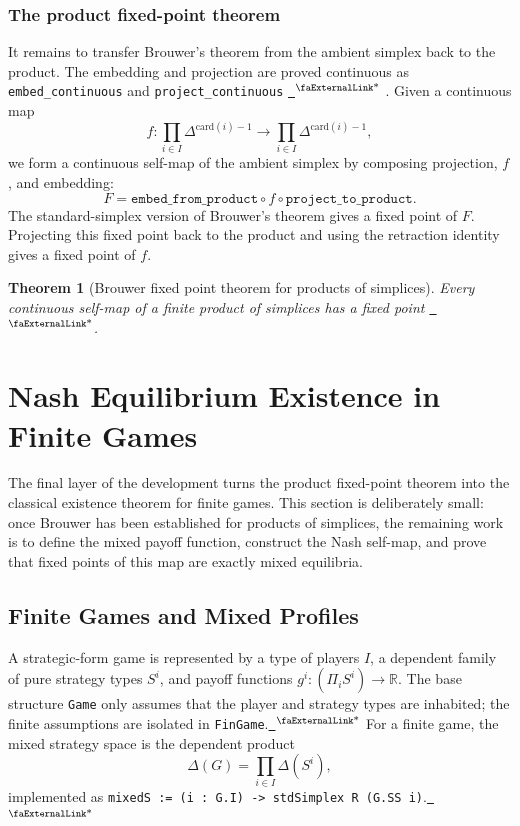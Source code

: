 \documentclass{article}
\newtheorem{theorem}{Theorem}[section]
\theoremstyle{definition}
\newcommand{\extlink}{~\ensuremath{{}^\text{\faExternalLink*}}}
\begin{document}
\subsubsection{The product fixed-point theorem}

It remains to transfer Brouwer's theorem from the ambient simplex back to the product. The embedding and projection are proved continuous as \texttt{embed\_continuous} and \texttt{project\_continuous}
\href{https://github.com/Solo-ary/Game-Theory-Formalization/blob/7b49d5267d4f26b17bdf071250880b63e96999b6/Brouwer/Gametheory/Brouwer_product.lean#L560-L652}{\extlink}
.
Given a continuous map
$$
f:\prod_{i\in I}\Delta^{\mathrm{card}(i)-1}
\to
\prod_{i\in I}\Delta^{\mathrm{card}(i)-1},
$$
we form a continuous self-map of the ambient simplex by composing projection, $f$, and embedding:
$$
F =
\texttt{embed\_from\_product}\circ f\circ \texttt{project\_to\_product}.
$$
The standard-simplex version of Brouwer's theorem gives a fixed point of $F$. Projecting this fixed point back to the product and using the retraction identity gives a fixed point of $f$.

\begin{theorem}[Brouwer fixed point theorem for products of simplices]
Every continuous self-map of a finite product of simplices has a fixed point
\href{https://github.com/Solo-ary/Game-Theory-Formalization/blob/7b49d5267d4f26b17bdf071250880b63e96999b6/Brouwer/Gametheory/Brouwer_product.lean#L654-L669}{\extlink}.
\end{theorem}


\section{Nash Equilibrium Existence in Finite Games}\label{sec:Nash}
The final layer of the development turns the product fixed-point theorem into the classical existence theorem for finite games.  This section is deliberately small: once Brouwer has been established for products of simplices, the remaining work is to define the mixed payoff function, construct the Nash self-map, and prove that fixed points of this map are exactly mixed equilibria.

\subsection{Finite Games and Mixed Profiles}
A strategic-form game is represented by a type of players $I$, a dependent family of pure strategy types $S^i$, and payoff functions $g^i : (\Pi_i S^i) \to \mathbb{R}$.  The base structure \texttt{Game} only assumes that the player and strategy types are inhabited; the finite assumptions are isolated in \texttt{FinGame}.\href{https://github.com/Solo-ary/Game-Theory-Formalization/blob/7b49d5267d4f26b17bdf071250880b63e96999b6/Brouwer/Gametheory/Nash.lean#L16-L49}{\extlink}  For a finite game, the mixed strategy space is the dependent product
$$
  \Delta(G) = \prod_{i\in I} \Delta(S^i),
$$
implemented as \texttt{mixedS := (i : G.I) -> stdSimplex R (G.SS i)}.\href{https://github.com/Solo-ary/Game-Theory-Formalization/blob/7b49d5267d4f26b17bdf071250880b63e96999b6/Brouwer/Gametheory/Nash.lean#L59-L60}{\extlink}
\end{document}
